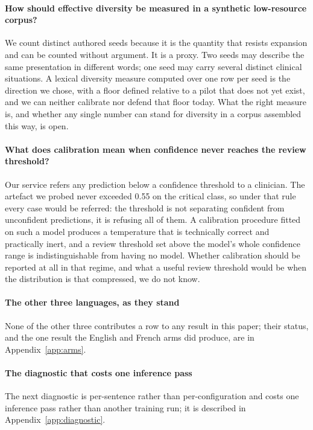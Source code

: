\paragraph{How should effective diversity be measured in a synthetic
low-resource corpus?} We count distinct authored seeds because it is the quantity
that resists expansion and can be counted without argument. It is a proxy. Two
seeds may describe the same presentation in different words; one seed may carry
several distinct clinical situations. A lexical diversity measure computed over
one row per seed is the direction we chose, with a floor defined relative to a
pilot that does not yet exist, and we can neither calibrate nor defend that floor
today. What the right measure is, and whether any single number can stand for
diversity in a corpus assembled this way, is open.

\paragraph{What does calibration mean when confidence never reaches the review
threshold?}\label{sec:future:calibration} Our service refers any prediction below a confidence threshold to a
clinician. The artefact we probed never exceeded 0.55 on the critical class, so
under that rule every case would be referred: the threshold is not separating
confident from unconfident predictions, it is refusing all of them. A calibration
procedure fitted on such a model produces a temperature that is technically
correct and practically inert, and a review threshold set above the model's whole
confidence range is indistinguishable from having no model. Whether calibration
should be reported at all in that regime, and what a useful review threshold
would be when the distribution is that compressed, we do not know.

\paragraph{The other three languages, as they stand}

None of the other three contributes a row to any result in this paper; their
status, and the one result the English and French arms did produce, are in
Appendix~\ref{app:arms}.

\paragraph{The diagnostic that costs one inference pass}

The next diagnostic is per-sentence rather than per-configuration and costs one
inference pass rather than another training run; it is described in
Appendix~\ref{app:diagnostic}.
